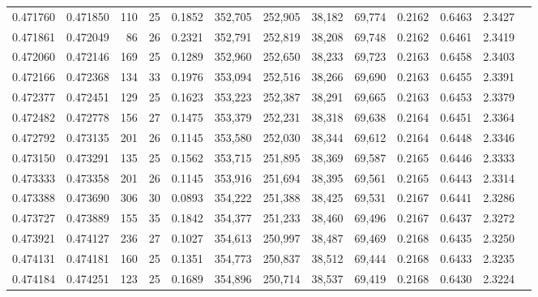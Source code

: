 \begin{tabular}{rrrrrrrrrrrrr}
0.471760 & 0.471850 &    110 &    25 &                                     0.1852 & 352,705 & 252,905 &  38,182 &  69,774 & 0.2162 & 0.6463 & 2.3427 \\
0.471861 & 0.472049 &     86 &    26 &                                     0.2321 & 352,791 & 252,819 &  38,208 &  69,748 & 0.2162 & 0.6461 & 2.3419 \\
0.472060 & 0.472146 &    169 &    25 &                                     0.1289 & 352,960 & 252,650 &  38,233 &  69,723 & 0.2163 & 0.6458 & 2.3403 \\
0.472166 & 0.472368 &    134 &    33 &                                     0.1976 & 353,094 & 252,516 &  38,266 &  69,690 & 0.2163 & 0.6455 & 2.3391 \\
0.472377 & 0.472451 &    129 &    25 &                                     0.1623 & 353,223 & 252,387 &  38,291 &  69,665 & 0.2163 & 0.6453 & 2.3379 \\
0.472482 & 0.472778 &    156 &    27 &                                     0.1475 & 353,379 & 252,231 &  38,318 &  69,638 & 0.2164 & 0.6451 & 2.3364 \\
0.472792 & 0.473135 &    201 &    26 &                                     0.1145 & 353,580 & 252,030 &  38,344 &  69,612 & 0.2164 & 0.6448 & 2.3346 \\
0.473150 & 0.473291 &    135 &    25 &                                     0.1562 & 353,715 & 251,895 &  38,369 &  69,587 & 0.2165 & 0.6446 & 2.3333 \\
0.473333 & 0.473358 &    201 &    26 &                                     0.1145 & 353,916 & 251,694 &  38,395 &  69,561 & 0.2165 & 0.6443 & 2.3314 \\
0.473388 & 0.473690 &    306 &    30 &                                     0.0893 & 354,222 & 251,388 &  38,425 &  69,531 & 0.2167 & 0.6441 & 2.3286 \\
0.473727 & 0.473889 &    155 &    35 &                                     0.1842 & 354,377 & 251,233 &  38,460 &  69,496 & 0.2167 & 0.6437 & 2.3272 \\
0.473921 & 0.474127 &    236 &    27 &                                     0.1027 & 354,613 & 250,997 &  38,487 &  69,469 & 0.2168 & 0.6435 & 2.3250 \\
0.474131 & 0.474181 &    160 &    25 &                                     0.1351 & 354,773 & 250,837 &  38,512 &  69,444 & 0.2168 & 0.6433 & 2.3235 \\
0.474184 & 0.474251 &    123 &    25 &                                     0.1689 & 354,896 & 250,714 &  38,537 &  69,419 & 0.2168 & 0.6430 & 2.3224 \\

\end{tabular}
